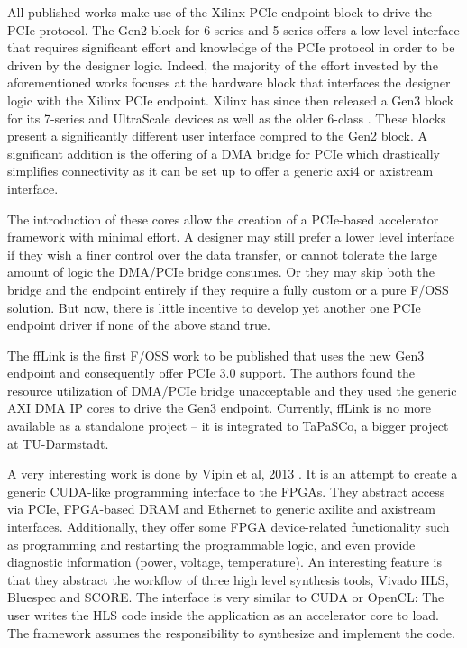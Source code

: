 All published works make use of the Xilinx PCIe endpoint block to drive the PCIe protocol. 
The Gen2 block for 6-series \cite{ug517} and 5-series \cite{ug197} offers a low-level interface that requires significant effort 
and knowledge of the PCIe protocol in order to be driven by the designer logic.
Indeed, the majority of the effort invested by the aforementioned works focuses 
at the hardware block that interfaces the designer logic with the Xilinx PCIe endpoint.
Xilinx has since then released a Gen3 block for its 7-series \cite{pg054} 
and UltraScale devices \cite{pg156} as well as the older 6-class \cite{ug671}.
These blocks present a significantly different user interface compred to the Gen2 block.
A significant addition is the offering of a DMA bridge for PCIe \cite{pg195} which drastically simplifies connectivity as it can be set up to offer
a generic \gls{axi}4 or \gls{axistream} interface.

The introduction of these cores allow the creation of a PCIe-based accelerator framework with minimal effort.
A designer may still prefer a lower level interface if they wish a finer control over the data transfer,
or cannot tolerate the large amount of logic \cite{dmapcie} the DMA/PCIe bridge consumes. 
Or they may skip both the bridge and the endpoint entirely if they require a fully custom or a pure F/OSS solution.
But now, there is little incentive to develop yet another one PCIe endpoint driver if none of the above stand true.

The ffLink \cite{fflink} is the first F/OSS work to be published that uses the new Gen3 endpoint and consequently offer PCIe 3.0 support.
The authors found the resource utilization of DMA/PCIe bridge unacceptable and they used the generic AXI DMA IP cores to drive the Gen3 endpoint.
Currently, ffLink is no more available as a standalone project -- it is integrated to TaPaSCo, a bigger project at TU-Darmstadt.

A very interesting work is done by Vipin et al, 2013 \cite{vipin}. 
It is an attempt to create a generic CUDA-like programming interface to the FPGAs. 
They abstract access via PCIe, FPGA-based DRAM and Ethernet to generic \gls{axilite} and \gls{axistream} interfaces.
Additionally, they offer some FPGA device-related functionality such as programming and restarting the programmable logic,
and even provide diagnostic information (power, voltage, temperature).
An interesting feature is that they abstract the workflow of three high level synthesis tools, Vivado HLS, Bluespec and SCORE.
The interface is very similar to CUDA or OpenCL: The user writes the HLS code inside the application as an accelerator core to load.
The framework assumes the responsibility to synthesize and implement the code.

